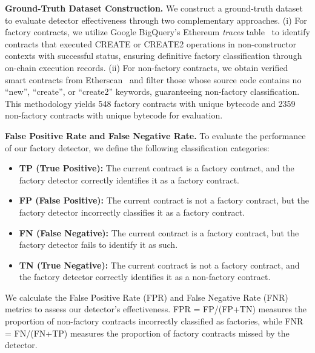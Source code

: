 \documentclass[acmsmall, screen]{acmart}
\begin{document}
	\textbf{Ground-Truth Dataset Construction.} We construct a ground-truth dataset to evaluate
	detector effectiveness through two complementary approaches. (i) For factory contracts, we
	utilize Google BigQuery's Ethereum \textit{traces} table~\cite{bigquery-ethereum-traces} to identify
	contracts that executed CREATE or CREATE2 operations in non-constructor contexts with successful
	status, ensuring definitive factory classification through on-chain execution records. (ii) For non-factory
	contracts, we obtain verified smart contracts from Etherscan~\cite{etherscan-verified-contracts}
	and filter those whose source code contains no ``new'', ``create'', or ``create2'' keywords, guaranteeing
	non-factory classification. This methodology yields 548 factory contracts with unique bytecode
	and 2359 non-factory contracts with unique bytecode for evaluation.

	\textbf{False Positive Rate and False Negative Rate.} To evaluate the performance of our factory
	detector, we define the following classification categories:
	\begin{itemize}[leftmargin=0.4cm,topsep=0.1cm]
		\item \textbf{TP (True Positive):} The current contract is a factory contract, and the factory
		detector correctly identifies it as a factory contract.

		\item \textbf{FP (False Positive):} The current contract is not a factory contract, but the factory
		detector incorrectly classifies it as a factory contract.

		\item \textbf{FN (False Negative):} The current contract is a factory contract, but the factory
		detector fails to identify it as such.

		\item \textbf{TN (True Negative):} The current contract is not a factory contract, and the factory
		detector correctly identifies it as a non-factory contract.
	\end{itemize}
	We calculate the False Positive Rate (FPR) and False Negative Rate (FNR) metrics to assess our detector's
	effectiveness. FPR = FP/(FP+TN) measures the proportion of non-factory contracts incorrectly
	classified as factories, while FNR = FN/(FN+TP) measures the proportion of factory contracts missed
	by the detector.
\end{document}
